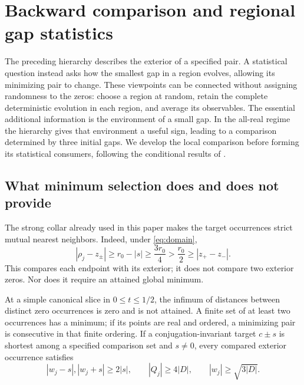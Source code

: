 \section{Backward comparison and regional gap statistics}
\label{sec:statistics}

The preceding hierarchy describes the exterior of a specified pair. A
statistical question instead asks how the smallest gap in a region evolves,
allowing its minimizing pair to change. These viewpoints can be connected
without assigning randomness to the zeros: choose a region at random,
retain the complete deterministic evolution in each region, and average
its observables. The essential additional information is the environment
of a small gap. In the all-real regime the hierarchy gives that environment
a useful sign, leading to a comparison determined by three initial gaps.
We develop the local comparison before forming its statistical consumers,
following the conditional results of \cite{BakerCM16,BakerCM17}.

\subsection{What minimum selection does and does not provide}

The strong collar already used in this paper makes the target occurrences
strict mutual nearest neighbors. Indeed, under \eqref{eq:domain},
\begin{equation}
 |\rho_j-z_\pm|\ge r_0-|s|\ge\frac{3r_0}{4}
 >\frac{r_0}{2}\ge |z_+-z_-|.
 \label{stat:mutual-neighbors}
\end{equation}
This compares each endpoint with its exterior; it does not compare two
exterior zeros. Nor does it require an attained global minimum.

\begin{proposition}
\label{stat:minimum-selection}
At a simple canonical slice in $0\le t\le1/2$, the infimum of distances
between distinct zero occurrences is zero and is not attained. A finite
set of at least two occurrences has a minimum; if its points are real and
ordered, a minimizing pair is consecutive in that finite ordering.
If a conjugation-invariant target $c\pm s$ is shortest among a specified
comparison set and $s\ne0$, every compared exterior occurrence satisfies
\begin{equation}
 |w_j-s|,|w_j+s|\ge2|s|,
 \qquad |Q_j|\ge4|D|,
 \qquad |w_j|\ge\sqrt{3|D|}.
 \label{stat:relative-collar}
\end{equation}
\end{proposition}

